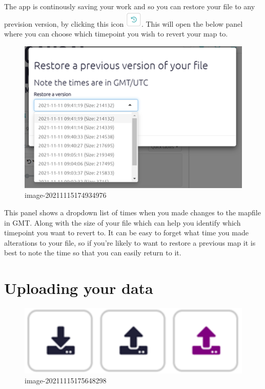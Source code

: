 \documentclass[
]{book}
\begin{document}
The app is continously saving your work and so you can restore your file to any prevision version, by clicking this icon \includegraphics{_assets/image-20211115175030770.png}. This will open the below panel where you can choose which timepoint you wish to revert your map to.

\begin{figure}
\centering
\includegraphics[width=6.77083in,height=\textheight]{_assets/image-20211115174934976.png}
\caption{image-20211115174934976}
\end{figure}

This panel shows a dropdown list of times when you made changes to the mapfile in GMT. Along with the size of your file which can help you identify which timepoint you want to revert to. It can be easy to forget what time you made alterations to your file, so if you're likely to want to restore a previous map it is best to note the time so that you can easily return to it.

\hypertarget{uploading-your-data}{%
\section{Uploading your data}\label{uploading-your-data}}

\begin{figure}
\centering
\includegraphics[width=6.77083in,height=\textheight]{_assets/image-20211115175648298.png}
\caption{image-20211115175648298}
\end{figure}
\end{document}
